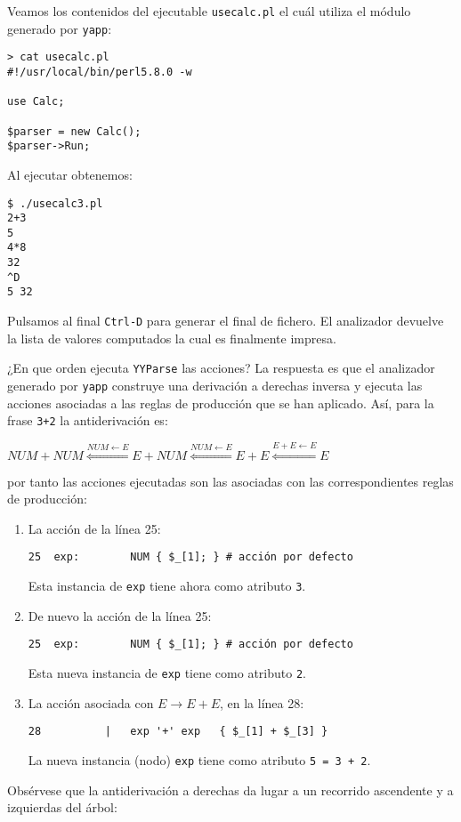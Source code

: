 Veamos los contenidos del ejecutable \verb|usecalc.pl| el cuál
utiliza el módulo generado por \verb|yapp|:
\begin{verbatim}
> cat usecalc.pl
#!/usr/local/bin/perl5.8.0 -w

use Calc;

$parser = new Calc();
$parser->Run;
\end{verbatim}
Al ejecutar obtenemos:
\begin{verbatim}
$ ./usecalc3.pl
2+3
5
4*8
32
^D
5 32
\end{verbatim}
Pulsamos al final \verb|Ctrl-D| para generar el final de fichero.
El analizador devuelve la lista de valores computados la cual es 
finalmente impresa.

¿En que orden ejecuta \verb|YYParse| las acciones? 
La respuesta es que el analizador generado por 
\verb|yapp| construye una derivación a derechas 
inversa y ejecuta las acciones asociadas a las reglas de producción
que se han aplicado. Así, para la frase \verb|3+2| la antiderivación es:

\begin{center}
\begin{math}
NUM + NUM \stackrel{NUM \leftarrow E}{\Longleftarrow} E + NUM \stackrel{NUM \leftarrow E}{\Longleftarrow} E + E \stackrel{E +E \leftarrow E}{\Longleftarrow} E
\end{math}
\end{center}

por tanto las acciones ejecutadas son las asociadas con las correspondientes reglas 
de producción:
\begin{enumerate}
\item
La acción de la línea 25:
\begin{verbatim}
25  exp:        NUM { $_[1]; } # acción por defecto 
\end{verbatim}
Esta instancia de \verb|exp| tiene ahora como atributo \verb|3|.
\item
De nuevo la acción de la línea 25:
\begin{verbatim}
25  exp:        NUM { $_[1]; } # acción por defecto 
\end{verbatim}
Esta nueva instancia de \verb|exp| tiene como atributo \verb|2|.
\item
La acción asociada con $E \rightarrow E + E$, en la línea 28:
\begin{verbatim}
28          |   exp '+' exp   { $_[1] + $_[3] }
\end{verbatim}
La nueva instancia (nodo) \verb|exp| tiene como atributo \verb|5 = 3 + 2|. 
\end{enumerate}
Obsérvese que la antiderivación a derechas da lugar a un
recorrido ascendente y a izquierdas del árbol:

